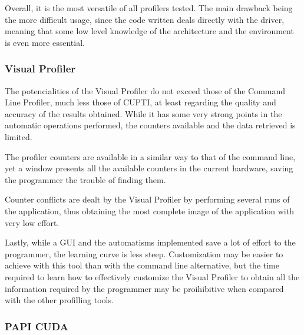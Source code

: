Overall, it is the most versatile of all profilers tested. The main drawback being the more difficult usage, since the code written deals directly with the driver, meaning that some low level knowledge of the architecture and the environment is even more essential.

\subsubsection{Visual Profiler}
\label{sec:533}

The potencialities of the Visual Profiler do not exceed those of the Command Line Profiler, much less those of CUPTI, at least regarding the quality and accuracy of the results obtained. While it has some very strong points in the automatic operations performed, the counters available and the data retrieved is limited.

The profiler counters are available in a similar way to that of the command line, yet a window presents all the available counters in the current hardware, saving the programmer the trouble of finding them.

Counter conflicts are dealt by the Visual Profiler by performing several runs of the application, thus obtaining the most complete image of the application with very low effort.

Lastly, while a GUI and the automatisms implemented save a lot of effort to the programmer, the learning curve is less steep. Customization may be easier to achieve with this tool than with the command line alternative, but the time required to learn how to effectively customize the Visual Profiler to obtain all the information required by the programmer may be proihibitive when compared with the other profilling tools.

\subsubsection{PAPI CUDA}
\label{sec:534}


